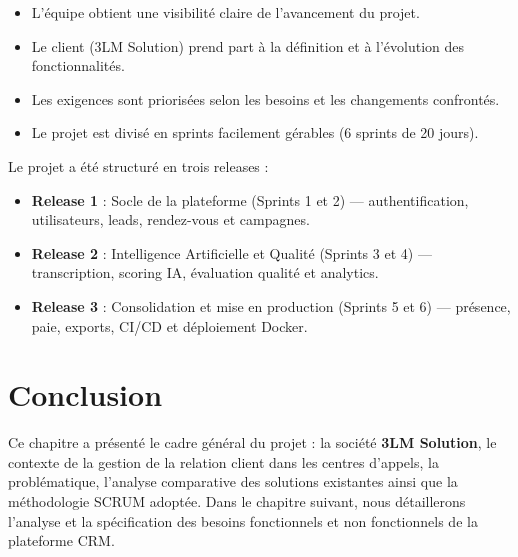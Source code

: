 \begin{itemize}
    \item L'équipe obtient une visibilité claire de l'avancement du projet.
    \item Le client (3LM Solution) prend part à la définition et à l'évolution des fonctionnalités.
    \item Les exigences sont priorisées selon les besoins et les changements confrontés.
    \item Le projet est divisé en sprints facilement gérables (6 sprints de 20 jours).
\end{itemize}

Le projet a été structuré en trois releases :
\begin{itemize}
    \item \textbf{Release 1} : Socle de la plateforme (Sprints 1 et 2) — authentification,
          utilisateurs, leads, rendez-vous et campagnes.
    \item \textbf{Release 2} : Intelligence Artificielle et Qualité (Sprints 3 et 4) —
          transcription, scoring IA, évaluation qualité et analytics.
    \item \textbf{Release 3} : Consolidation et mise en production (Sprints 5 et 6) — présence,
          paie, exports, CI/CD et déploiement Docker.
\end{itemize}

\section*{Conclusion}
\label{sec:chap1_conclusion}

Ce chapitre a présenté le cadre général du projet : la société \textbf{3LM Solution}, le contexte
de la gestion de la relation client dans les centres d'appels, la problématique, l'analyse
comparative des solutions existantes ainsi que la méthodologie SCRUM adoptée. Dans le chapitre
suivant, nous détaillerons l'analyse et la spécification des besoins fonctionnels et non
fonctionnels de la plateforme CRM.
